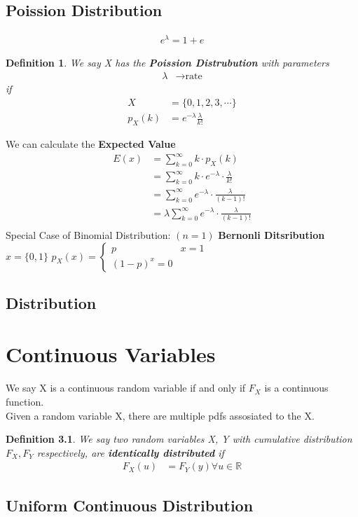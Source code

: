 \documentclass[11pt,oneside]{book}
\theoremstyle{break}
\theoremstyle{break}
\newtheorem{defn}{Definition}[corL]
\begin{document}
\section[Poisson Distribution]{Poission Distribution}
\begin{align*}
e^{\lambda}=1+e
\end{align*}
\begin{defn}
We say X has the \textbf{Poission Distrubution} with parameters \begin{align*}
\lambda &\rightarrow \text{rate}
\end{align*}
if \begin{align*}
X&=\{0,1,2,3,\cdots\}\\
p_X(k)&=e^{-\lambda}\frac{\lambda}{k!}
\end{align*}
\end{defn}
We can calculate the \textbf{Expected Value}
\begin{align*}
E(x)&=\sum_{k=0}^{\infty}k\cdot p_X(k)\\
&=\sum_{k=0}^{\infty}k\cdot e^{-\lambda}\cdot \frac{\lambda}{k!}\\
&=\sum_{k=0}^{\infty} e^{-\lambda}\cdot \frac{\lambda}{(k-1)!}\\
&=\lambda \sum_{k=0}^{\infty} e^{-\lambda}\cdot \frac{\lambda}{(k-1)!}\\
\end{align*}
Special Case of Binomial Distribution: $(n=1)$
\textbf{Bernonli Ditsribution}\\
$x=\{0,1\}$
$p_X(x)=\begin{cases}p&x=1\\ (1-p)^x=0\end{cases}$\\
\section[Geometric Distribution]{Distribution}
\chapter[Continuous Variables]{Continuous Variables}
We say X is a continuous random variable if and only if $F_X$ is a continuous function.\\
Given a random variable X, there are multiple pdfs assosiated to the X.\begin{defn}
We say two random variables X, Y with cumulative distribution $F_X,F_Y$ respectively, are \textbf{identically distributed} if \begin{align*}
F_X(u)&=F_Y(y)\forall u \in \mathbb{R}
\end{align*}
\end{defn}
\section[Uniform Continuous Distribution]{Uniform Continuous Distribution}
	
\end{document}
